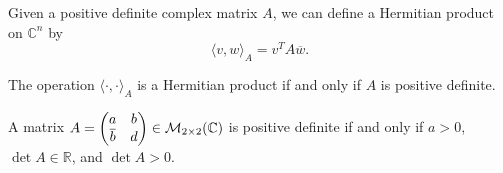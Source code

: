 Given a positive definite complex matrix $A$, we can define a Hermitian product on $\mathbb{C}^n$ by
\begin{equation*}
    \langle v, w \rangle_A = v^T A \overline{w}.
\end{equation*}

\begin{claim*}
    The operation $\langle \cdot, \cdot \rangle_A$ is a Hermitian product if and only if $A$ is positive definite.
\end{claim*}

\begin{exercise}
    A matrix $A = \begin{pmatrix} a & b \\ \overline{b} & d \end{pmatrix} \in \mathcal{M}_{2 \times 2}(\mathbb{C})$ is positive definite if and only if $a > 0$, $\det A \in \mathbb{R}$, and $\det A > 0$.
\end{exercise}


